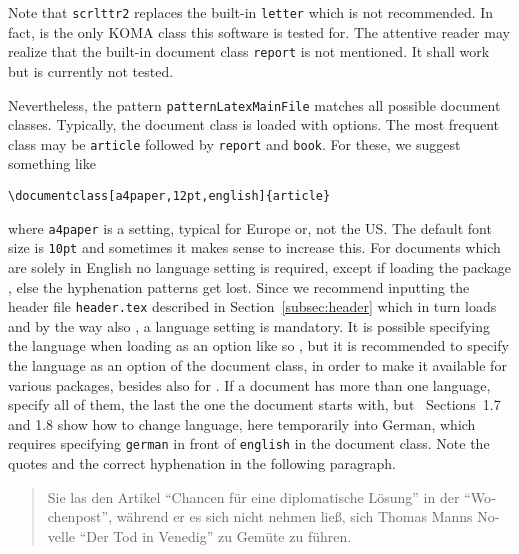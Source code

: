 Note that \texttt{scrlttr2} replaces the built-in \texttt{letter} which is not recommended. 
In fact, is the only KOMA class this software is tested for. 
The attentive reader may realize 
that the built-in document class \texttt{report} is not mentioned. 
It shall work but is currently not tested. 

Nevertheless, the pattern \texttt{patternLatexMainFile} 
matches all possible document classes. 
Typically, the document class is loaded with options. 
The most frequent class may be \texttt{article} 
followed by \texttt{report} and \texttt{book}. 
For these, we suggest something like
%
\begin{Verbatim}
\documentclass[a4paper,12pt,english]{article}
\end{Verbatim}
%
where \texttt{a4paper} is a setting, typical for Europe or, not the US\@. 
The default font size is \texttt{10pt} and sometimes it makes sense to increase this. 
For documents which are solely in English no language setting is required, 
except if loading the package , else the hyphenation patterns get lost. 
Since we recommend inputting the header file \texttt{header.tex} 
described in Section~\ref{subsec:header} which in turn loads  and 
by the way also , a language setting is mandatory. 
It is possible specifying the language when loading  as an option 
like so , 
but it is recommended to specify the language as an option of the document class, 
in order to make it available for various packages, 
besides  also for . 
If a document has more than one language, specify all of them, 
the last the one the document starts with, 
but~\cite{BabelP24} Sections~1.7 and 1.8 show how to change language, 
here temporarily into German, 
which requires specifying \texttt{german} in front of \texttt{english} 
in the document class. 
Note the quotes and the correct hyphenation in the following paragraph. 

\begin{quote}
\begin{otherlanguage}{german}
  Sie las den Artikel \enquote{Chancen für eine diplomatische Lösung} 
  in der "`Wochenpost"', während er es sich nicht nehmen ließ, %
  sich Thomas Manns Novelle "`{Der Tod in Venedig}"' zu Gemüte zu führen. %
\end{otherlanguage}
\end{quote}

